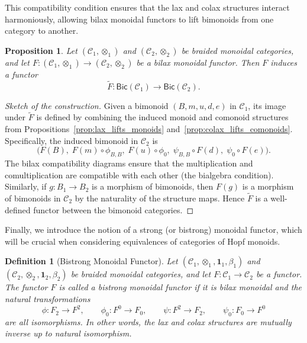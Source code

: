 \documentclass{amsart}
\newtheorem{proposition}{Proposition}[section]
\newtheorem{definition}{Definition}[section]
\begin{document}
This compatibility condition ensures that the lax and colax structures interact harmoniously, allowing bilax monoidal functors to lift bimonoids from one category to another.

\begin{proposition}\label{prop:bilax_lifts_bimonoids}
Let $(\mathcal{C}_1, \otimes_1)$ and $(\mathcal{C}_2, \otimes_2)$ be braided monoidal categories, and let $F \colon (\mathcal{C}_1, \otimes_1) \longrightarrow (\mathcal{C}_2, \otimes_2)$ be a bilax monoidal functor. Then $F$ induces a functor
\[
\widetilde{F} \colon \mathsf{Bic}(\mathcal{C}_1) \longrightarrow \mathsf{Bic}(\mathcal{C}_2).
\]
\end{proposition}

\begin{proof}[Sketch of the construction]
Given a bimonoid $(B, m, u, d, e)$ in $\mathcal{C}_1$, its image under $\widetilde{F}$ is defined by combining the induced monoid and comonoid structures from Propositions~\ref{prop:lax_lifts_monoids} and~\ref{prop:colax_lifts_comonoids}. Specifically, the induced bimonoid in $\mathcal{C}_2$ is
\[
\bigl( F(B),\; F(m) \circ \phi_{B,B},\; F(u) \circ \phi_0,\; \psi_{B,B} \circ F(d),\; \psi_0 \circ F(e) \bigr).
\]
The bilax compatibility diagrams ensure that the multiplication and comultiplication are compatible with each other (the bialgebra condition). Similarly, if $g \colon B_1 \to B_2$ is a morphism of bimonoids, then $F(g)$ is a morphism of bimonoids in $\mathcal{C}_2$ by the naturality of the structure maps. Hence $\widetilde{F}$ is a well-defined functor between the bimonoid categories.
\end{proof}

Finally, we introduce the notion of a strong (or bistrong) monoidal functor, which will be crucial when considering equivalences of categories of Hopf monoids.

\begin{definition}[Bistrong Monoidal Functor]\label{def:bistrong}
Let $(\mathcal{C}_1, \otimes_1, \mathbf{1}_1, \beta_1)$ and $(\mathcal{C}_2, \otimes_2, \mathbf{1}_2, \beta_2)$ be braided monoidal categories, and let $F \colon \mathcal{C}_1 \longrightarrow \mathcal{C}_2$ be a functor. The functor $F$ is called a bistrong monoidal functor if it is bilax monoidal and the natural transformations
\[
\phi \colon F_2 \longrightarrow F^2, \qquad
\phi_0 \colon F^0 \longrightarrow F_0, \qquad
\psi \colon F^2 \longrightarrow F_2, \qquad
\psi_0 \colon F_0 \longrightarrow F^0
\]
are all isomorphisms. In other words, the lax and colax structures are mutually inverse up to natural isomorphism.
\end{definition}
\end{document}
